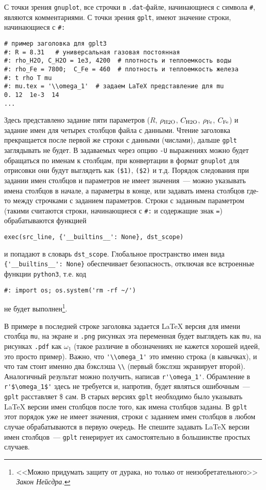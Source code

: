 \documentclass[12pt]{article}
\def\gplt{{\tt gplt}}
\def\gnuplot{{\tt gnuplot}}
\def\python{{\tt python3}}
\def\png{{\tt .png}}
\def\pdf{{\tt .pdf}}
\begin{document}
С точки зрения \gnuplot, все строчки в \verb'.dat'-файле, начинающиеся с символа \verb'#', являются комментариями. С точки зрения \gplt{},
имеют значение строки, начинающиеся с \verb'#:'
\begin{verbatim}
# пример заголовка для gplt3
#: R = 8.31   # универсальная газовая постоянная
#: rho_H2O, C_H2O = 1e3, 4200  # плотность и теплоемкость воды
#: rho_Fe = 7800;  C_Fe = 460  # плотность и теплоемкость железа
#: t rho T mu
#: mu.tex = '\\omega_1'  # задаем LaTeX представление для mu
0. 12  1e-3  14
...
\end{verbatim}
Здесь представлено задание пяти параметров ($R$, $\rho_{\rm H2O}$, $C_{\rm H2O}$, $\rho_{\rm Fe}$, $C_{\rm Fe}$) и задание имен для четырех столбцов файла с данными.
Чтение заголовка прекращается после первой же строки с данными (числами), дальше \gplt{} заглядывать не будет. В задаваемых через опцию \verb'-U'
выражениях можно будет обращаться по именам к столбцам, при конвертации в формат \gnuplot{} для отрисовки они будут выглядеть как \verb'($1)', \verb'($2)' и т.д.
Порядок следования при задании имен столбцов и параметров не имеет значения~--- можно указывать имена столбцов в начале, а параметры в конце, или задавать имена столбцов
где-то между строчками с заданием параметров. Строки с заданным параметром (такими считаются строки, начинающиеся с \verb'#:' и содержащие знак \verb'=')
обрабатываются функцией
\begin{verbatim}
exec(src_line, {'__builtins__': None}, dst_scope)
\end{verbatim}
и попадают в словарь \verb'dst_scope'. Глобальное пространство имен вида \verb|{'__builtins__': None}| обеспечивает безопасность, отключая все
встроенные функции \python{}, т.е. код
\begin{verbatim}
#: import os; os.system('rm -rf ~/')
\end{verbatim}
не будет выполнен\footnote{<<Можно придумать защиту от дурака, но только от неизобретательного>> {\it Закон Нейсдра.}}. 

В примере в последней строке заголовка задается \LaTeX{} версия для имени столбца \verb'mu', на экране и \png{} рисунках эта переменная
будет выглядеть как \verb'mu', на рисунках \pdf{} как $\omega_1$ (такое различие в обозначениях не кажется хорошей идеей, это просто пример).
Важно, что \verb|'\\omega_1'| это именно строка (в кавычках), и что там стоит именно два бэкслэша \verb'\\' (первый бэкслэш экранирует второй).
Аналогичный результат можно получить, написав \verb|r'\omega_1'|. Обрамление в \verb|r'$\omega_1$'| здесь не требуется и, напротив, будет являться
ошибочным~--- \gplt{} расставляет \$ сам.
В старых версиях \verb'gplt' необходимо было указывать \LaTeX{} версии имен столбцов после того, как имена столбцов заданы.
В \gplt{} этот порядок уже не имеет значения, строки с заданием имен столбцов в любом случае обрабатываются в первую очередь.
Не спешите задавать \LaTeX{} версии имен столбцов~--- \gplt{} генерирует их самостоятельно в большинстве простых случаев.
\end{document}
